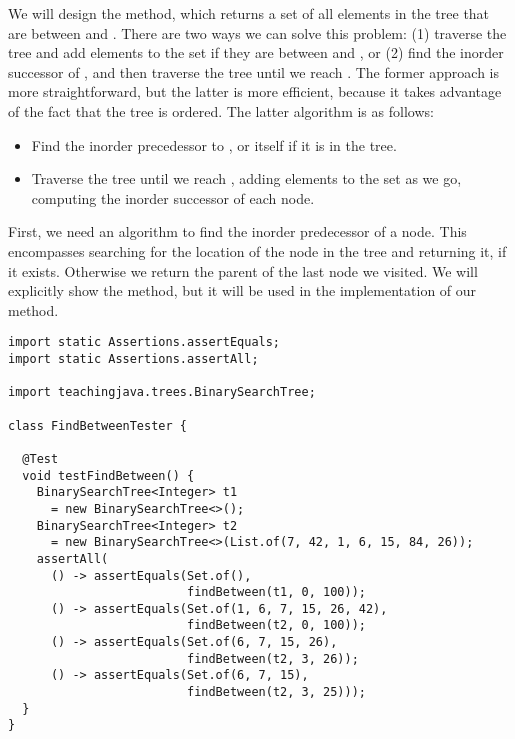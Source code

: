 We will design the  method, which returns a set of all elements in the tree that are between  and . 
There are two ways we can solve this problem: (1) traverse the tree and add elements to the set if they are between  and , or (2) find the inorder successor of , and then traverse the tree until we reach .
The former approach is more straightforward, but the latter is more efficient, because it takes advantage of the fact that the tree is ordered. 
The latter algorithm is as follows:
\begin{itemize}
  \item Find the inorder precedessor to , or  itself if it is in the tree.
  \item Traverse the tree until we reach , adding elements to the set as we go, computing the inorder successor of each node.
\end{itemize}

First, we need an algorithm to find the inorder predecessor of a node. 
This encompasses searching for the location of the node in the tree and returning it, if it exists. Otherwise we return the parent of the last node we visited. We will explicitly show the  method, but it will be used in the implementation of our  method.

\begin{lstlisting}[language=MyJava]
import static Assertions.assertEquals;
import static Assertions.assertAll;

import teachingjava.trees.BinarySearchTree;

class FindBetweenTester {

  @Test
  void testFindBetween() {
    BinarySearchTree<Integer> t1 
      = new BinarySearchTree<>();
    BinarySearchTree<Integer> t2 
      = new BinarySearchTree<>(List.of(7, 42, 1, 6, 15, 84, 26));
    assertAll(
      () -> assertEquals(Set.of(), 
                         findBetween(t1, 0, 100));
      () -> assertEquals(Set.of(1, 6, 7, 15, 26, 42), 
                         findBetween(t2, 0, 100));
      () -> assertEquals(Set.of(6, 7, 15, 26), 
                         findBetween(t2, 3, 26));
      () -> assertEquals(Set.of(6, 7, 15), 
                         findBetween(t2, 3, 25)));
  }
}
\end{lstlisting}

